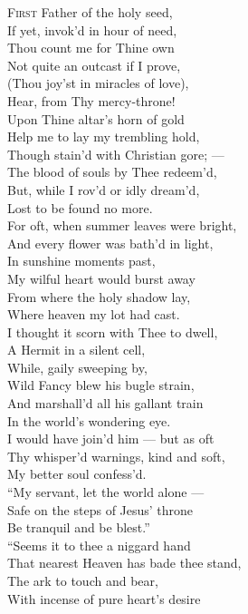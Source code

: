 \textsc{First} Father of the holy seed, \\
 If yet, invok’d in hour of need, \\
 Thou count me for Thine own \\
 Not quite an outcast if I prove, \\
 (Thou joy’st in miracles of love), \\
 Hear, from Thy mercy-throne! \\
  Upon Thine altar’s horn of gold \\
 Help me to lay my trembling hold, \\
 Though stain’d with Christian gore; — \\
 The blood of souls by Thee redeem’d, \\
 But, while I rov’d or idly dream’d, \\
 Lost to be found no more. \\
  For oft, when summer leaves were bright, \\
 And every flower was bath’d in light, \\
 In sunshine moments past, \\
 My wilful heart would burst away \\
 From where the holy shadow lay, \\
 Where heaven my lot had cast. \\
  I thought it scorn with Thee to dwell, \\
 A Hermit in a silent cell, \\
 While, gaily sweeping by, \\
 Wild Fancy blew his bugle strain, \\
 And marshall’d all his gallant train \\
 In the world’s wondering eye. \\
  I would have join’d him — but as oft \\
 Thy whisper’d warnings, kind and soft, \\
 My better soul confess’d. \\
 “My servant, let the world alone — \\
 Safe on the steps of Jesus’ throne \\
 Be tranquil and be blest.” \\
  “Seems it to thee a niggard hand \\
 That nearest Heaven has bade thee stand, \\
 The ark to touch and bear, \\
 With incense of pure heart’s desire \\
